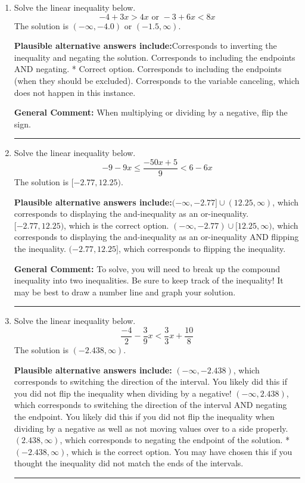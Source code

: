 \documentclass{extbook}[14pt]
\newcommand{\litem}[1]{\item #1

\rule{\textwidth}{0.4pt}}
\begin{document}
\begin{enumerate}
{\textbf{General Comment:} Remember that less/greater than or equal to includes the endpoint, while less/greater do not. Also, remember that you need to flip the inequality when you multiply or divide by a negative.
}
\litem{
Solve the linear inequality below.
\[ -4 + 3 x > 4 x \text{ or } -3 + 6 x < 8 x \]The solution is \( (-\infty, -4.0) \text{ or } (-1.5, \infty) \).\begin{enumerate}[label=\Alph*.]
\textbf{Plausible alternative answers include:}Corresponds to inverting the inequality and negating the solution.
Corresponds to including the endpoints AND negating.
 * Correct option.
Corresponds to including the endpoints (when they should be excluded).
Corresponds to the variable canceling, which does not happen in this instance.
\end{enumerate}

\textbf{General Comment:} When multiplying or dividing by a negative, flip the sign.
}
\litem{
Solve the linear inequality below.
\[ -9 - 9 x \leq \frac{-50 x + 5}{9} < 6 - 6 x \]The solution is \( [-2.77, 12.25) \).\begin{enumerate}[label=\Alph*.]
\textbf{Plausible alternative answers include:}$(-\infty, -2.77] \cup (12.25, \infty)$, which corresponds to displaying the and-inequality as an or-inequality.
$[-2.77, 12.25)$, which is the correct option.
$(-\infty, -2.77) \cup [12.25, \infty)$, which corresponds to displaying the and-inequality as an or-inequality AND flipping the inequality.
$(-2.77, 12.25]$, which corresponds to flipping the inequality.

\end{enumerate}

\textbf{General Comment:} To solve, you will need to break up the compound inequality into two inequalities. Be sure to keep track of the inequality! It may be best to draw a number line and graph your solution.
}
\litem{
Solve the linear inequality below.
\[ \frac{-4}{2} - \frac{3}{9} x < \frac{3}{3} x + \frac{10}{8} \]The solution is \( (-2.438, \infty) \).\begin{enumerate}[label=\Alph*.]
\textbf{Plausible alternative answers include:} $(-\infty, -2.438)$, which corresponds to switching the direction of the interval. You likely did this if you did not flip the inequality when dividing by a negative!
 $(-\infty, 2.438)$, which corresponds to switching the direction of the interval AND negating the endpoint. You likely did this if you did not flip the inequality when dividing by a negative as well as not moving values over to a side properly.
 $(2.438, \infty)$, which corresponds to negating the endpoint of the solution.
* $(-2.438, \infty)$, which is the correct option.
You may have chosen this if you thought the inequality did not match the ends of the intervals.
\end{enumerate}

}
\end{enumerate}
\end{document}
